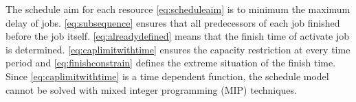 The schedule aim for each resource \autoref{eq:scheduleaim} is to minimum the maximum delay of jobs. \autoref{eq:subsequence} ensures that all predecessors of each job finished before the job itself. \autoref{eq:alreadydefined} means that the finish time of activate job is determined. \autoref{eq:caplimitwithtime} ensures the capacity restriction at every time period and \autoref{eq:finishconstrain} defines the extreme situation of the finish time.
Since \autoref{eq:caplimitwithtime} is a time dependent function, the schedule model cannot be
solved with mixed integer programming (MIP) techniques.



